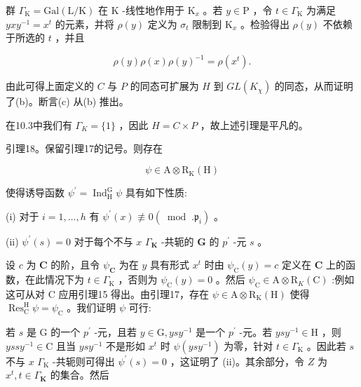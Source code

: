 \documentclass[10pt]{article}
\begin{document}
群 \({\Gamma }_{\mathrm{K}} = \mathrm{{Gal}}\left( {\mathrm{L}/\mathrm{K}}\right)\) 在 \(\mathrm{K}\) -线性地作用于 \({\mathrm{K}}_{x}\) 。若 \(y \in  \mathrm{P}\) ，令 \(t \in  {\Gamma }_{\mathrm{K}}\) 为满足 \({yx}{y}^{-1} = {x}^{t}\) 的元素，并将 \(\rho \left( y\right)\) 定义为 \({\sigma }_{t}\) 限制到 \({\mathrm{K}}_{x}\) 。检验得出 \(\rho \left( y\right)\) 不依赖于所选的 \(t\) ，并且

\[
\rho \left( y\right) \rho \left( x\right) \rho {\left( y\right) }^{-1} = \rho \left( {x}^{t}\right) .
\]

由此可得上面定义的 \(C\) 与 \(P\) 的同态可扩展为 \(H\) 到 \({GL}\left( {K}_{\chi }\right)\) 的同态，从而证明了(b)。断言(c) 从(b) 推出。

在10.3中我们有 \({\Gamma }_{K} = \{ 1\}\) ，因此 \(H = C \times  P\) ，故上述引理是平凡的。

引理18。保留引理17的记号。则存在

\[
\psi  \in  \mathrm{A} \otimes  {\mathrm{R}}_{\mathrm{K}}\left( \mathrm{H}\right)
\]

使得诱导函数 \({\psi }^{\prime } = {\operatorname{Ind}}_{\mathrm{H}}^{\mathrm{G}}\psi\) 具有如下性质:

(i) 对于 \(i = 1,\ldots ,h\) 有 \({\psi }^{\prime }\left( x\right)  \text{ ≢ } 0\left( {\;\operatorname{mod}\;.{\mathfrak{p}}_{i}}\right)\) 。

(ii) \({\psi }^{\prime }\left( s\right)  = 0\) 对于每个不与 \(x\)  \({\Gamma }_{\mathbf{K}}\) -共轭的 \(\mathbf{G}\) 的 \({p}^{\prime }\) -元 \(s\) 。

设 \(c\) 为 \(\mathbf{C}\) 的阶，且令 \({\psi }_{\mathbf{C}}\) 为在 \(y\) 具有形式 \({x}^{t}\) 时由 \({\psi }_{\mathrm{C}}\left( y\right)  = c\) 定义在 \(\mathbf{C}\) 上的函数，在此情况下为 \(t \in  {\Gamma }_{\mathrm{K}}\) ，否则为 \({\psi }_{\mathrm{C}}\left( y\right)  = 0\) 。然后 \({\psi }_{\mathrm{C}} \in  \mathrm{A} \otimes  {\mathrm{R}}_{K}\left( \mathrm{C}\right)\) :例如这可从对 \(\mathrm{C}\) 应用引理15 得出。由引理17，存在 \(\psi  \in  \mathrm{A} \otimes  {\mathrm{R}}_{\mathrm{K}}\left( \mathrm{H}\right)\) 使得 \({\operatorname{Res}}_{\mathrm{C}}^{\mathrm{H}}\psi  = {\psi }_{\mathrm{C}}\) 。我们证明 \(\psi\) 可行:

若 \(s\) 是 \(\mathrm{G}\) 的一个 \({p}^{\prime }\) -元，且若 \(y \in  \mathrm{G},{ys}{y}^{-1}\) 是一个 \({p}^{\prime }\) -元。若 \({ys}{y}^{-1} \in  \mathrm{H}\) ，则 \({yss}{y}^{-1} \in  \mathrm{C}\) 且当 \({ys}{y}^{-1}\) 不是形如 \({x}^{t}\) 时 \(\psi \left( {{ys}{y}^{-1}}\right)\) 为零，针对 \(t \in  {\Gamma }_{\mathrm{K}}\) 。因此若 \(s\) 不与 \(x\)  \({\Gamma }_{\mathrm{K}}\) -共轭则可得出 \({\psi }^{\prime }\left( s\right)  = 0\) ，这证明了 (ii)。其余部分，令 \(Z\) 为 \({x}^{t},t \in  {\Gamma }_{\mathbf{K}}\) 的集合。然后
\end{document}
